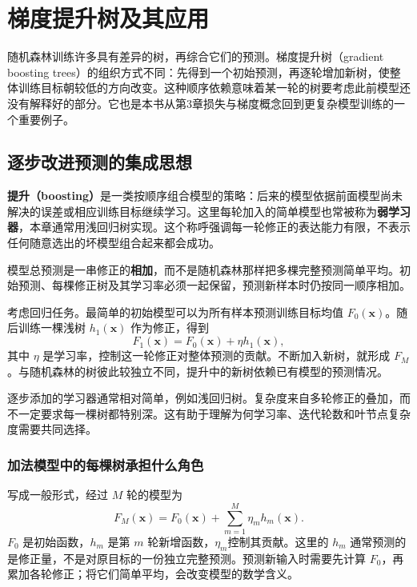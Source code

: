 \chapter{梯度提升树及其应用}

随机森林训练许多具有差异的树，再综合它们的预测。梯度提升树（gradient boosting trees）的组织方式不同：先得到一个初始预测，再逐轮增加新树，使整体训练目标朝较低的方向改变。这种顺序依赖意味着某一轮的树要考虑此前模型还没有解释好的部分。它也是本书从第3章损失与梯度概念回到更复杂模型训练的一个重要例子。
\section{逐步改进预测的集成思想}

\textbf{提升（boosting）}是一类按顺序组合模型的策略：后来的模型依据前面模型尚未解决的误差或相应训练目标继续学习。这里每轮加入的简单模型也常被称为\textbf{弱学习器}，本章通常用浅回归树实现。这个称呼强调每一轮修正的表达能力有限，不表示任何随意选出的坏模型组合起来都会成功。

模型总预测是一串修正的\textbf{相加}，而不是随机森林那样把多棵完整预测简单平均。初始预测、每棵修正树及其学习率必须一起保留，预测新样本时仍按同一顺序相加。

考虑回归任务。最简单的初始模型可以为所有样本预测训练目标均值 $F_0(\mathbf x)$。随后训练一棵浅树 $h_1(\mathbf x)$ 作为修正，得到
\begin{equation}
F_1(\mathbf x)=F_0(\mathbf x)+\eta h_1(\mathbf x),
\end{equation}
其中 $\eta$ 是学习率，控制这一轮修正对整体预测的贡献。不断加入新树，就形成 $F_M$。与随机森林的树彼此较独立不同，提升中的新树依赖已有模型的预测情况。

逐步添加的学习器通常相对简单，例如浅回归树。复杂度来自多轮修正的叠加，而不一定要求每一棵树都特别深。这有助于理解为何学习率、迭代轮数和叶节点复杂度需要共同选择。

\subsection{加法模型中的每棵树承担什么角色}
写成一般形式，经过 $M$ 轮的模型为
\[
F_M(\mathbf x)=F_0(\mathbf x)+\sum_{m=1}^M\eta_m h_m(\mathbf x).
\]
$F_0$ 是初始函数，$h_m$ 是第 $m$ 轮新增函数，$\eta_m$控制其贡献。这里的 $h_m$ 通常预测的是修正量，不是对原目标的一份独立完整预测。预测新输入时需要先计算 $F_0$，再累加各轮修正；将它们简单平均，会改变模型的数学含义。

